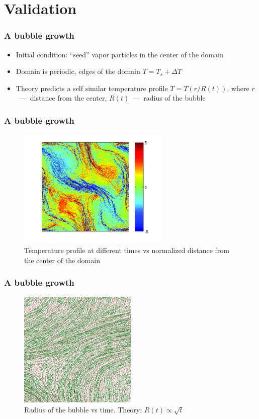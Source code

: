 \documentclass{beamer}
\begin{document}
\section{Validation}
\begin{frame}
  \frametitle{A bubble growth}
  \begin{itemize}
  \item Initial condition: ``seed'' vapor particles in the center of
    the domain
  \item Domain is periodic, edges of the domain $T=T_s +
    \Delta T$
  \item Theory predicts a self similar temperature profile $T =
    T(r/R(t))$, where $r$~---~distance from the center, $R(t)$~---~radius of
    the bubble
  \end{itemize}
\end{frame}

\begin{frame}
  \frametitle{A bubble growth}
  \begin{figure}
    \centering
    \includegraphics[width=0.65\textwidth]{img/polymer_loc-14.png}
    \caption{Temperature profile at different times vs normalized
      distance from the center of the domain}
    \label{fig:self}
  \end{figure}
\end{frame}

\begin{frame}
  \frametitle{A bubble growth}
  \begin{figure}[ht]
    \centering
    \includegraphics[width=0.5\textwidth]{img/polymer_loc.png}
    \caption{Radius of the bubble vs time. Theory: $R(t) \propto \sqrt{t}$}
    \label{fig:dep}
  \end{figure}
\end{frame}
\end{document}
